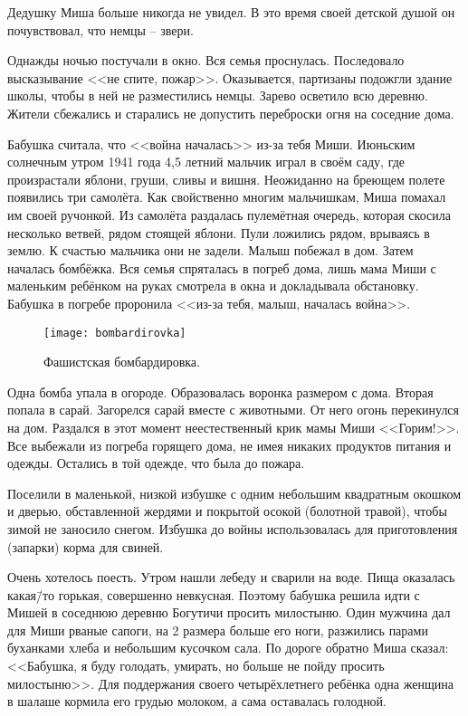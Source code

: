 Дедушку Миша больше никогда не увидел. В это время своей детской душой он почувствовал, что немцы \--- звери.

Однажды ночью постучали в окно. Вся семья проснулась. Последовало высказывание <<не спите, пожар>>. Оказывается, партизаны подожгли здание школы, чтобы в ней не разместились немцы. Зарево осветило всю деревню. Жители сбежались и старались не допустить переброски огня на соседние дома.

Бабушка считала, что <<война началась>> из-за тебя Миши. Июньским солнечным утром 1941 года 4,5 летний мальчик играл в своём саду, где произрастали яблони, груши, сливы и вишня. Неожиданно на бреющем полете появились три самолёта. Как свойственно многим мальчишкам, Миша помахал им своей ручонкой. Из самолёта раздалась пулемётная очередь, которая скосила несколько ветвей, рядом стоящей яблони. Пули ложились рядом, врываясь в землю. К счастью мальчика они не задели. Малыш побежал в дом. Затем началась бомбёжка. Вся семья спряталась в погреб дома, лишь мама Миши с маленьким ребёнком на руках смотрела в окна и докладывала обстановку. Бабушка в погребе проронила <<из-за тебя, малыш, началась война>>.

\begin{wrapfigure}{O}{.4\textwidth}
\centering
\texttt{[image: bombardirovka]}
\caption{Фашистская бомбардировка.}
\label{fig:bombardirovka}
\end{wrapfigure}

Одна бомба упала в огороде. Образовалась воронка размером с дома. Вторая попала в сарай. Загорелся сарай вместе с животными. От него огонь перекинулся на дом. Раздался в этот момент неестественный крик мамы Миши <<Горим!>>. Все выбежали из погреба горящего дома, не имея никаких продуктов питания и одежды. Остались в той одежде, что была до пожара.

Поселили в маленькой, низкой избушке с одним небольшим квадратным окошком и дверью, обставленной жердями и покрытой осокой (болотной травой), чтобы зимой не заносило снегом. Избушка до войны использовалась для приготовления (запарки) корма для свиней.

Очень хотелось поесть. Утром нашли лебеду и сварили на воде. Пища оказалась какая\=/то горькая, совершенно невкусная. Поэтому бабушка решила идти с Мишей в соседнюю деревню Богутичи просить милостыню. Один мужчина дал для Миши рваные сапоги, на 2 размера больше его ноги, разжились парами буханками хлеба и небольшим кусочком сала. По дороге обратно Миша сказал: <<Бабушка, я буду голодать, умирать, но больше не пойду просить милостыню>>. Для поддержания своего четырёхлетнего ребёнка одна женщина в шалаше кормила его грудью молоком, а сама оставалась голодной.

